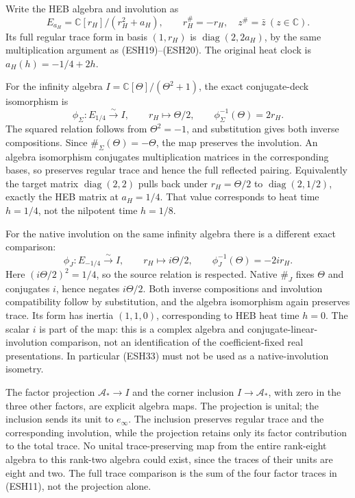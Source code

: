 \documentclass[
  10pt,
  a4paper,
]{article}
\begin{document}
Write the HEB algebra and involution as \[
E_{a_H}=\mathbb C[r_H]/(r_H^2+a_H),\qquad
r_H^\#=-r_H,\quad z^\#=\bar z\ (z\in\mathbb C).
\tag{ESH32}
\] Its full regular trace form in basis \((1,r_H)\) is
\(\operatorname{diag}(2,2a_H)\), by the same multiplication argument as
(ESH19)--(ESH20). The original heat clock is \(a_H(h)=-1/4+2h\).

For the infinity algebra \(I=\mathbb C[\Theta]/(\Theta^2+1)\), the exact
conjugate-deck isomorphism is \[
\phi_\Sigma:E_{1/4}\xrightarrow{\sim}I,
\qquad r_H\longmapsto\Theta/2,
\qquad\phi_\Sigma^{-1}(\Theta)=2r_H.
\tag{ESH33}
\] The squared relation follows from \(\Theta^2=-1\), and substitution
gives both inverse compositions. Since \(\#_\Sigma(\Theta)=-\Theta\),
the map preserves the involution. An algebra isomorphism conjugates
multiplication matrices in the corresponding bases, so preserves regular
trace and hence the full reflected pairing. Equivalently the target
matrix \(\operatorname{diag}(2,2)\) pulls back under \(r_H=\Theta/2\) to
\(\operatorname{diag}(2,1/2)\), exactly the HEB matrix at \(a_H=1/4\).
That value corresponds to heat time \(h=1/4\), not the nilpotent time
\(h=1/8\).

For the native involution on the same infinity algebra there is a
different exact comparison: \[
\phi_J:E_{-1/4}\xrightarrow{\sim}I,
\qquad r_H\longmapsto i\Theta/2,
\qquad\phi_J^{-1}(\Theta)=-2i r_H.
\tag{ESH34}
\] Here \((i\Theta/2)^2=1/4\), so the source relation is respected.
Native \(\#_J\) fixes \(\Theta\) and conjugates \(i\), hence negates
\(i\Theta/2\). Both inverse compositions and involution compatibility
follow by substitution, and the algebra isomorphism again preserves
trace. Its form has inertia \((1,1,0)\), corresponding to HEB heat time
\(h=0\). The scalar \(i\) is part of the map: this is a complex algebra
and conjugate-linear-involution comparison, not an identification of the
coefficient-fixed real presentations. In particular (ESH33) must not be
used as a native-involution isometry.

The factor projection \(\mathcal A_*\to I\) and the corner inclusion
\(I\to\mathcal A_*\), with zero in the three other factors, are explicit
algebra maps. The projection is unital; the inclusion sends its unit to
\(e_\infty\). The inclusion preserves regular trace and the
corresponding involution, while the projection retains only its factor
contribution to the total trace. No unital trace-preserving map from the
entire rank-eight algebra to this rank-two algebra could exist, since
the traces of their units are eight and two. The full trace comparison
is the sum of the four factor traces in (ESH11), not the projection
alone.
\end{document}
